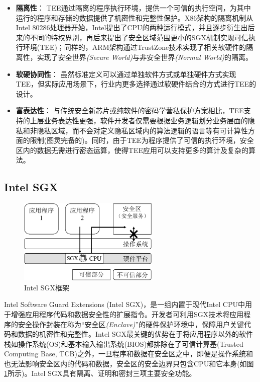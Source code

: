 \begin{itemize}[leftmargin=0em]
    \item \textbf{隔离性}：
          TEE通过隔离的程序执行环境，提供一个可信的执行空间，为其中运行的程序和存储的数据提供了机密性和完整性保护。X86架构的隔离机制从Intel 80286处理器开始，Intel提出了CPU的两种运行模式，并且逐步衍生出后来的不同的特权界别，再后来提出了安全区域范围更小的SGX机制实现可信执行环境(TEE)；同样的，ARM架构通过TrustZone技术实现了相关软硬件的隔离性，实现了安全世界\textit{(Secure World)}与非安全世界\textit{(Normal World)}的隔离。
    \item \textbf{软硬协同性}：
          虽然标准定义可以通过单独软件方式或单独硬件方式实现TEE，但实际应用场景下，行业内更多选择通过软硬件结合的方式进行TEE的设计。
    \item \textbf{富表达性}：
          与传统安全新芯片或纯软件的密码学营私保护方案相比，TEE支持的上层业务表达性更强，软件开发者仅需要根据业务逻辑划分业务层面的隐私和非隐私区域，而不会对定义隐私区域内的算法逻辑的语言等有可计算性方面的限制(图灵完备的)。同时，由于TEE为程序提供了可信的执行环境，安全区内的数据无需进行密态运算，使得TEE应用可以支持更多的算计及复杂的算法。
\end{itemize}

\subsection{Intel SGX}
\label{subsec:background-tee-sgx}

\begin{figure}[!htb]
    \small
    \centering
    \includegraphics[width=0.6\textwidth]{pic/background/sgx-example.pdf}
    \caption{Intel SGX框架}
    \label{fig:sgx-arch}
\end{figure}

Intel Software Guard Extensions (Intel SGX)\cite{sgx,sgx2}，是一组内置于现代Intel CPU中用于增强应用程序代码和数据安全性的扩展指令。开发者可利用SGX技术将应用程序的安全操作封装在称为“安全区\textit{(Enclave)}”的硬件保护环境中，保障用户关键代码和数据的机密性和完整性。Intel SGX最关键的优势在于将应用程序以外的软件栈如操作系统(OS)和基本输入输出系统(BIOS)都排除在了可信计算基(Trusted Computing Base, TCB)之外，一旦程序和数据在安全区之中，即便是操作系统和也无法影响安全区内的代码和数据，安全区的安全边界只包含CPU和它本身(如图\ref{fig:sgx-arch}所示)。Intel SGX具有隔离、证明和密封三项主要安全功能。

